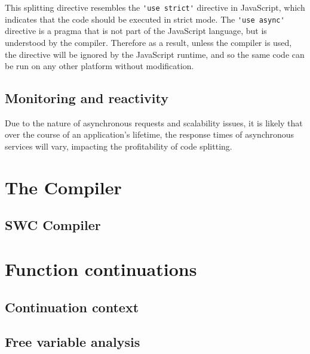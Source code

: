 This splitting directive resembles the \verb|'use strict'| directive in JavaScript, which indicates that the code should be executed in strict mode. The \verb|'use async'| directive is a pragma that is not part of the JavaScript language, but is understood by the \faaasc{} compiler. Therefore as a result, unless the \faaasc{} compiler is used, the directive will be ignored by the JavaScript runtime, and so the same code can be run on any other \faas{} platform without modification.

\subsection{Monitoring and reactivity}
Due to the nature of asynchronous requests and scalability issues, it is likely that over the course of an application's lifetime, the response times of asynchronous services will vary, impacting the profitability of code splitting.


\section{The \faaasc{} Compiler}

\subsection{SWC Compiler}

\section{Function continuations}

\subsection{Continuation context}

\subsection{Free variable analysis}

